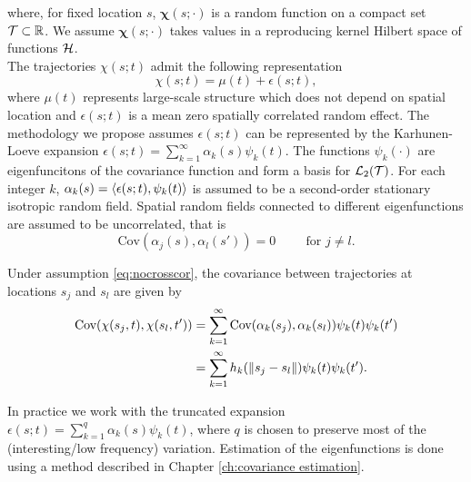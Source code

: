 	where, for fixed location $s$, $\boldsymbol\chi(s; \cdot)$ is a random function on a compact set $\mathcal{T} \subset  \mathbb{R} $. We assume $\boldsymbol\chi(s; \cdot)$  takes values in a reproducing kernel Hilbert space of functions $\mathcal{H}$. \\[0.2cm]
	
	The trajectories $\chi(s;t)$ admit the following representation 
\begin{equation}
 	\chi(s;t) = \mu(t) + \epsilon(s;t),
\end{equation}
where $\mu(t)$ represents large-scale structure which does not depend on spatial location and $\epsilon(s;t)$ is a mean zero spatially correlated random effect. The methodology we propose assumes $\epsilon(s;t)$ can be represented by the Karhunen-Loeve expansion $\epsilon(s;t) = \sum_{k=1}^{\infty} \alpha_k(s)\psi_k(t)$. The functions $\psi_k(\cdot)$ are eigenfuncitons of the covariance function and form a basis for $\mathcal{L}_2(\mathcal{T})$. For each integer $k$, $\alpha_k(s) = \langle \epsilon(s;t),  \psi_k(t) \rangle$ is assumed to be a second-order stationary isotropic random field. Spatial random fields connected to different eigenfunctions are assumed to be uncorrelated, that is 
\begin{equation}
	\text{Cov}(\alpha_j(s), \alpha_l(s')) = 0 \hspace{1cm} \text{for } j \neq l.
	\label{eq:nocrosscor}
\end{equation} 

Under assumption  \eqref{eq:nocrosscor}, the covariance between trajectories at locations $s_j$ and $s_l$ are given by 
\begin{align}
	\text{Cov}(\chi(s_j,t), \chi(s_l, t')) &= \sum_{k=1}^{\infty}\text{Cov}(\alpha_k(s_j), \alpha_k(s_l))\psi_k(t)\psi_k(t')\\
	&= \sum_{k=1}^{\infty}h_k(\left\|s_j-s_l\right\|)\psi_k(t)\psi_k(t'). 
	\label{eq:cov}
\end{align}


In practice we work with the truncated expansion $\epsilon(s;t) = \sum_{k=1}^{q} \alpha_k(s)\psi_k(t)$, where $q$ is chosen to preserve most of the (interesting/low frequency) variation. Estimation of the eigenfunctions is done using a method described in Chapter \ref{ch:covariance estimation}.

 

